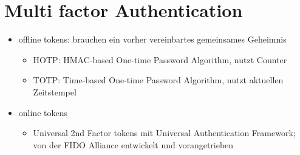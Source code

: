 \section{Multi factor Authentication}%
\label{sec:multi_factor_authentication}

\begin{itemize}
  \item offline tokens: brauchen ein vorher vereinbartes gemeinsames Geheimnis
    \begin{itemize}
      \item HOTP: HMAC-based One-time Password Algorithm, nutzt Counter
      \item TOTP: Time-based One-time Password Algorithm, nutzt aktuellen Zeitstempel
    \end{itemize}
  \item online tokens
    \begin{itemize}
      \item Universal 2nd Factor tokens mit Universal Authentication Framework; von der
        FIDO Alliance entwickelt und vorangetrieben
    \end{itemize}
\end{itemize}
